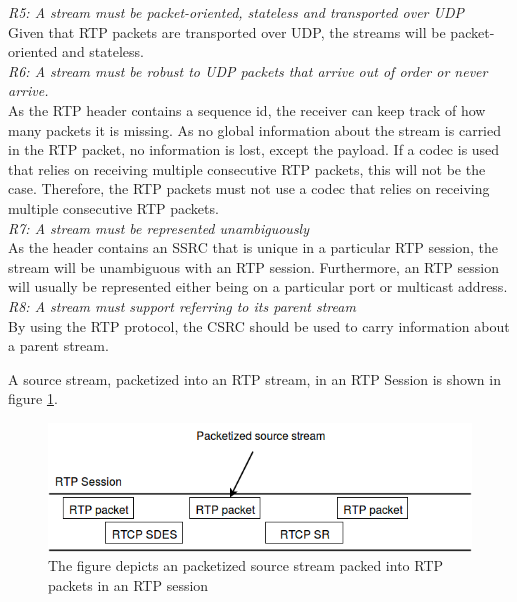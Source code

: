 \noindent\textit{R5: A stream must be packet-oriented, stateless and transported over UDP} \\
Given that RTP packets are transported over UDP, the streams will be packet-oriented and stateless.\\

\noindent\textit{R6: A stream must be robust to UDP packets that arrive out of order or never arrive.} \\
As the RTP header contains a sequence id, the receiver can keep track of how many packets it is missing. As no global information about the stream is carried in the RTP packet, no information is lost, except the payload. If a codec is used that relies on receiving multiple consecutive RTP packets, this will not be the case. Therefore, the RTP packets must not use a codec that relies on receiving multiple consecutive RTP packets. \\

\noindent\textit{R7: A stream must be represented unambiguously} \\
As the header contains an SSRC that is unique in a particular RTP session, the stream will be unambiguous with an RTP session. Furthermore, an RTP session will usually be represented either being on a particular port or multicast address.\\

\noindent\textit{R8: A stream must support referring to its parent stream} \\
By using the RTP protocol, the CSRC should be used to carry information about a parent stream.

A source stream, packetized into an RTP stream, in an RTP Session is shown in figure \ref{fig:design:stream}.

\begin{figure}[H]
	\centering
	\includegraphics[width=\textwidth]{figures/sourcestream-in-rtp}
	\caption{The figure depicts an packetized source stream packed into RTP packets in an RTP session}
	\label{fig:design:stream}
\end{figure}


